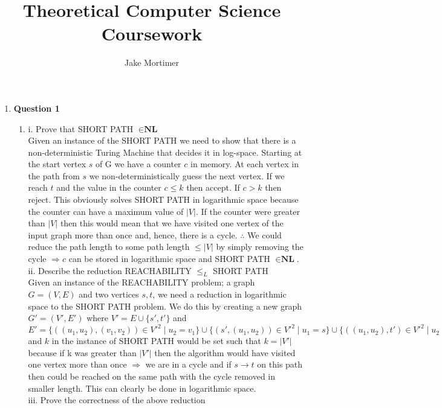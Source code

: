 \documentclass[12pt]{article}
\begin{document}
\title{\vspace{-5cm} Theoretical Computer Science Coursework}
\author{Jake Mortimer}
\maketitle
\begin{enumerate}
\section{Complexity and Approximability} 
\item \textbf{Question 1}
\begin{enumerate}
\item 
i. Prove that SHORT PATH $\in \textbf{NL}$ \\
Given an instance of the SHORT PATH we need to show that there is a non-deterministic Turing Machine that decides it in log-space. Starting at the start vertex $s$ of G we have a counter $c$ in memory. At each vertex in the path from $s$ we non-deterministically guess the next vertex. If we reach $t$ and the value in the counter $c \leq k$ then accept. If $c>k$ then reject. This obviously solves SHORT PATH in logarithmic space because the counter can have a maximum value of $|V|$. If the counter were greater than $|V|$ then this would mean that we have visited one vertex of the input graph more than once and, hence, there is a cycle. $\therefore $ We could reduce the path length to some path length $\leq |V|$ by simply removing the cycle $\Rightarrow c$ can be stored in logarithmic space and SHORT PATH $\in \textbf{NL}$.\\
ii. Describe the reduction REACHABILITY $\leq _{L} $ SHORT PATH \\
Given an instance of the REACHABILITY problem; a graph $G=(V,E)$ and two vertices $s,t$, we need a reduction in logarithmic space to the SHORT PATH problem. We do this by creating a new graph $G'=(V',E')$ where $V'=E \cup \{s',t'\}$ and $E'=\{((u_1,u_2),(v_1,v_2))\in V'^2 \mid u_2 = v_1\} \cup \{(s',(u_1,u_2)) \in V'^2 \mid u_1=s\} \cup \{((u_1,u_2),t') \in V'^2 \mid u_2=t\}$ and $k$ in the instance of SHORT PATH would be set such that $k=|V'|$ because if k was greater than $|V'|$ then the algorithm would have visited one vertex more than once $\Rightarrow$ we are in a cycle and if $s \rightarrow t$ on this path then could be reached on the same path with the cycle removed in smaller length. This can clearly be done in logarithmic space.\\
iii. Prove the correctness of the above reduction\\

\end{enumerate}
\end{enumerate}
\end{document}
